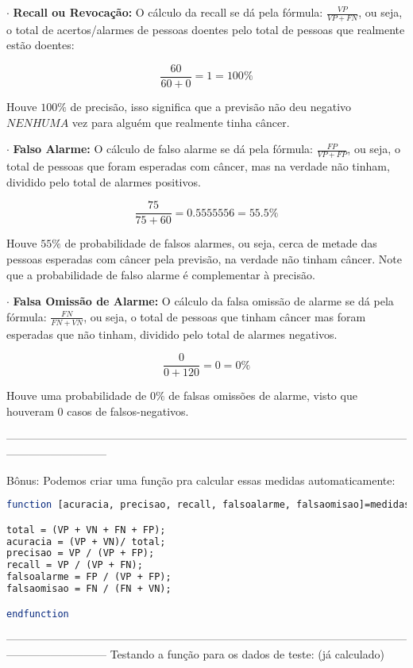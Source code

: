 \documentclass[leqno]{article}
\numberwithin{equation}{section}
\begin{document}
\begin{enumerate}
	$\cdot$ \textbf{{\large Recall ou Revocação:}} 
	O cálculo da recall se dá pela fórmula: $\frac{VP}{VP + FN}$, ou seja, o total de acertos/alarmes de pessoas doentes pelo total de pessoas que realmente estão doentes:
	
	$$\frac{60}{60 + 0} = 1 = 100\% $$
	
	Houve $100\%$ de precisão, isso significa que a previsão não deu negativo $NENHUMA$ vez para alguém que realmente tinha câncer. 
	
	$\cdot$ \textbf{{\large Falso Alarme:}}
	O cálculo de falso alarme se dá pela fórmula: $\frac{FP}{VP + FP}$, ou seja, o total de pessoas que foram esperadas com câncer, mas na verdade não tinham, dividido pelo total de alarmes positivos.
	
	$$\frac{75}{75 + 60} = 0.5555556 = 55.5\% $$
	
	Houve $55\%$ de probabilidade de falsos alarmes, ou seja, cerca de metade das pessoas esperadas com câncer pela previsão, na verdade não tinham câncer. Note que a probabilidade de falso alarme é complementar à precisão.
	
	$\cdot$ \textbf{{\large Falsa Omissão de Alarme:}} 
	O cálculo da falsa omissão de alarme se dá pela fórmula: $\frac{FN}{FN + VN}$, ou seja, o total de pessoas que tinham câncer mas foram esperadas que não tinham, dividido pelo total de alarmes negativos.
	
	$$\frac{0}{0 + 120} = 0 = 0\% $$
	
	Houve uma probabilidade de $0\%$ de falsas omissões de alarme, visto que houveram 0 casos de falsos-negativos.
	
---------------------------------------------------------------------------------------------------------------------------------------
	
	Bônus: Podemos criar uma função pra calcular essas medidas automaticamente: 
	
	\begin{lstlisting}[style=mystyle, language=Scilab]
function [acuracia, precisao, recall, falsoalarme, falsaomisao]=medidas(VP, VN, FN, FP)

total = (VP + VN + FN + FP);
acuracia = (VP + VN)/ total;
precisao = VP / (VP + FP);
recall = VP / (VP + FN);
falsoalarme = FP / (VP + FP);
falsaomisao = FN / (FN + VN);

endfunction
	\end{lstlisting}

---------------------------------------------------------------------------------------------------------------------------------------
	Testando a função para os dados de teste: (já calculado)
	

\end{enumerate}
\end{document}
